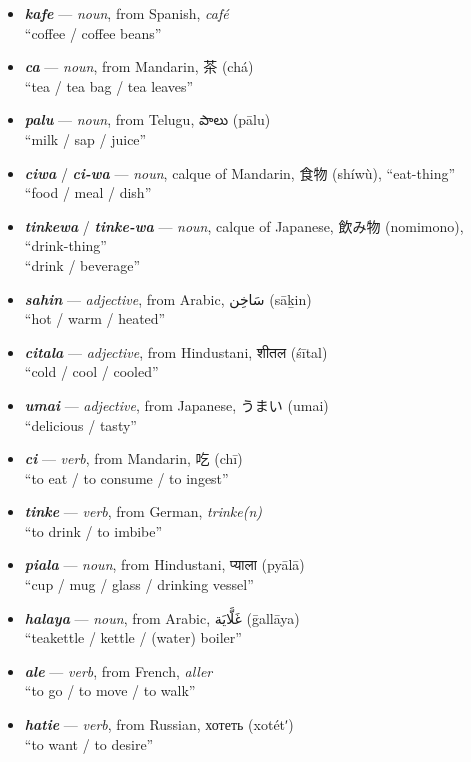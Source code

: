 \documentclass[a4paper, titlepage]{article}
\begin{document}
\begin{itemize}
	\item \textbf{\textit{kafe}} — \textit{noun}, from Spanish, \textit{café} \\``coffee / coffee beans''
	\item \textbf{\textit{ca}} — \textit{noun}, from Mandarin, 茶 (chá) \\``tea / tea bag / tea leaves''
	\item \textbf{\textit{palu}} — \textit{noun}, from Telugu, {\tlgfont పాలు} (pālu) \\``milk / sap / juice''
	\item \textbf{\textit{ciwa}} / \textbf{\textit{ci-wa}} — \textit{noun}, calque of Mandarin, 食物 (shíwù), ``eat-thing'' \\``food / meal / dish''
	\item \textbf{\textit{tinkewa}}  / \textbf{\textit{tinke-wa}} — \textit{noun}, calque of Japanese, 飲み物 (nomimono), ``drink-thing'' \\``drink / beverage''
	\item \textbf{\textit{sahin}} — \textit{adjective}, from Arabic, {\afont  سَاخِن } (sāḵin) \\``hot / warm / heated''
	\item \textbf{\textit{citala}} — \textit{adjective}, from Hindustani, {\hmfont शीतल} (śītal) \\``cold / cool / cooled''
	\item \textbf{\textit{umai}} — \textit{adjective}, from Japanese, うまい (umai) \\``delicious / tasty''
	\item \textbf{\textit{ci}} — \textit{verb}, from Mandarin, 吃 (chī) \\``to eat / to consume / to ingest''
	\item \textbf{\textit{tinke}} — \textit{verb}, from German, \textit{trinke(n)} \\``to drink / to imbibe''
	\item \textbf{\textit{piala}} — \textit{noun}, from Hindustani, {\hmfont  प्याला} (pyālā) \\ ``cup / mug / glass / drinking vessel''
	\item \textbf{\textit{halaya}} — \textit{noun}, from Arabic, {\afont  غَلَّايَة } (ḡallāya) \\ ``teakettle / kettle / (water) boiler''
	\item \textbf{\textit{ale}} — \textit{verb}, from French, \textit{aller} \\``to go / to move / to walk''
	\item \textbf{\textit{hatie}} — \textit{verb}, from Russian, хотеть (xotétʹ) \\ ``to want / to desire''

\end{itemize}
\end{document}
